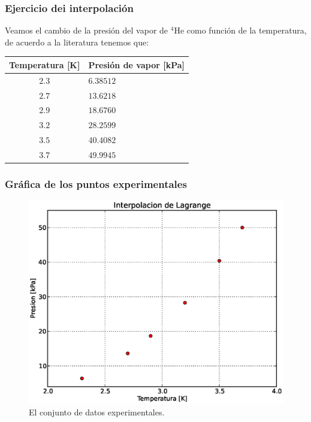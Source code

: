 \documentclass[12pt]{beamer}
\begin{document}
\begin{frame}
\frametitle{Ejercicio dei interpolación}
Veamos el cambio de la presión del vapor de {}$^{4}$He como función de la temperatura, de acuerdo a la literatura tenemos que:
\pause
\begin{center}
\renewcommand{\arraystretch}{0.9}
\begin{tabular}{c | l@{}}
Temperatura [K] & Presión de vapor [kPa] \\
\hline $2.3$ & $6.38512$ \\
\hline $2.7$ & $13.6218$ \\
\hline $2.9$ & $18.6760$ \\
\hline $3.2$ & $28.2599$ \\
\hline $3.5$ & $40.4082$ \\
\hline $3.7$ & $49.9945$
\end{tabular}
\end{center}
\end{frame}
\begin{frame}
\frametitle{Gráfica de los puntos experimentales}
\begin{figure}
	\centering
	\includegraphics[scale=0.4]{Imagenes/grafica03_1.eps}
	\caption{El conjunto de datos experimentales.}
\end{figure}
\end{frame}
\end{document}
